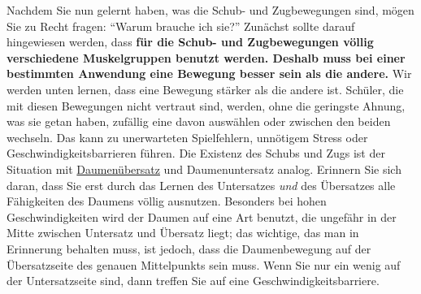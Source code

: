 Nachdem Sie nun gelernt haben, was die Schub- und Zugbewegungen sind, mögen Sie zu Recht fragen: \enquote{Warum brauche ich sie?}
Zunächst sollte darauf hingewiesen werden, dass \textbf{für die Schub- und Zugbewegungen völlig verschiedene Muskelgruppen benutzt werden.
Deshalb muss bei einer bestimmten Anwendung eine Bewegung besser sein als die andere.}
Wir werden unten lernen, dass eine Bewegung stärker als die andere ist.
Schüler, die mit diesen Bewegungen nicht vertraut sind, werden, ohne die geringste Ahnung, was sie getan haben, zufällig eine davon auswählen oder zwischen den beiden wechseln.
Das kann zu unerwarteten Spielfehlern, unnötigem Stress oder Geschwindigkeitsbarrieren führen.
Die Existenz des Schubs und Zugs ist der Situation mit \hyperlink{c1iii5b}{Daumenübersatz} und Daumenuntersatz analog.
Erinnern Sie sich daran, dass Sie erst durch das Lernen des Untersatzes \textit{und} des Übersatzes alle Fähigkeiten des Daumens völlig ausnutzen.
Besonders bei hohen Geschwindigkeiten wird der Daumen auf eine Art benutzt, die ungefähr in der Mitte zwischen Untersatz und Übersatz liegt; das wichtige, das man in Erinnerung behalten muss, ist jedoch, dass die Daumenbewegung auf der Übersatzseite des genauen Mittelpunkts sein muss.
Wenn Sie nur ein wenig auf der Untersatzseite sind, dann treffen Sie auf eine Geschwindigkeitsbarriere.

